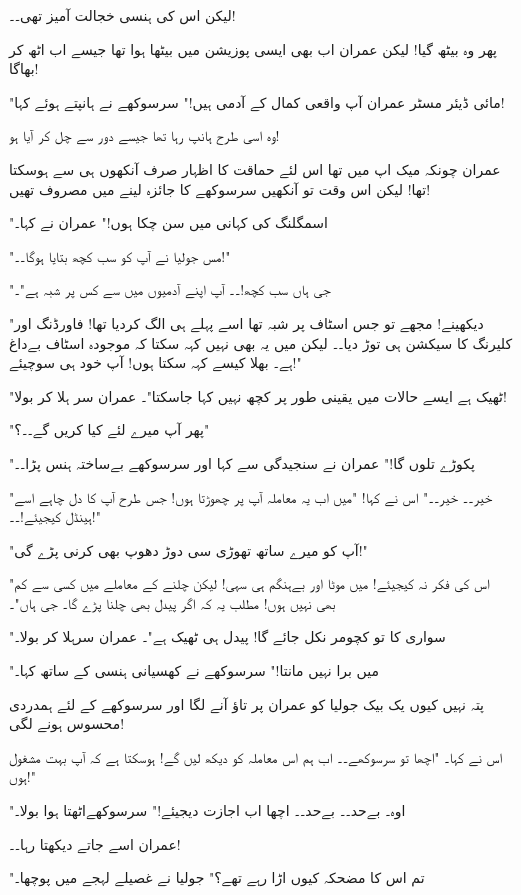 لیکن اس کی ہنسی خجالت آمیز تھی۔۔!

پھر وہ بیٹھ گیا! لیکن عمران اب بھی ایسی پوزیشن میں بیٹھا ہوا تھا جیسے اب اٹھ کر بھاگا!

"مائی ڈیئر مسٹر عمران آپ واقعی کمال کے آدمی ہیں!" سرسوکھے نے ہانپتے ہوئے کہا!

وہ اسی طرح ہانپ رہا تھا جیسے دور سے چل کر آیا ہو!

عمران چونکہ میک اپ میں تھا اس لئے حماقت کا اظہار صرف آنکھوں ہی سے ہوسکتا تھا! لیکن اس وقت تو آنکھیں سرسوکھے کا جائزہ لینے میں مصروف تھیں!

"اسمگلنگ کی کہانی میں سن چکا ہوں!" عمران نے کہا۔

"مس جولیا نے آپ کو سب کچھ بتایا ہوگا۔۔!"

"جی ہاں سب کچھ!۔۔ آپ اپنے آدمیوں میں سے کس پر شبہ ہے"۔

"دیکھینے! مجھے تو جس اسٹاف پر شبہ تھا اسے پہلے ہی الگ کردیا تھا! فاورڈنگ اور کلیرنگ کا سیکشن ہی توڑ دیا۔۔ لیکن میں یہ بھی نہیں کہہ سکتا کہ موجودہ اسٹاف بےداغ ہے۔ بھلا کیسے کہہ سکتا ہوں! آپ خود ہی سوچیئے!"

"ٹھیک ہے ایسے حالات میں یقینی طور پر کچھ نہیں کہا جاسکتا"۔ عمران سر ہلا کر بولا!

"پھر آپ میرے لئے کیا کریں گے۔۔؟"

"پکوڑے تلوں گا!" عمران نے سنجیدگی سے کہا اور سرسوکھے بےساختہ ہنس پڑا۔۔

"خیر۔۔ خیر۔۔" اس نے کہا! "میں اب یہ معاملہ آپ پر چھوڑتا ہوں! جس طرح آپ کا دل چاہے اسے ہینڈل کیجیئے!۔۔!"

"آپ کو میرے ساتھ تھوڑی سی دوڑ دھوپ بھی کرنی پڑے گی!"

"اس کی فکر نہ کیجیئے! میں موٹا اور بےہنگم ہی سہی! لیکن چلنے کے معاملے میں کسی سے کم بھی نہیں ہوں! مطلب یہ کہ اگر پیدل بھی چلنا پڑے گا۔ جی ہاں"۔

"سواری کا تو کچومر نکل جائے گا! پیدل ہی ٹھیک ہے"۔ عمران سرہلا کر بولا۔

"میں برا نہیں مانتا!" سرسوکھے نے کھسیانی ہنسی کے ساتھ کہا۔

پتہ نہیں کیوں یک بیک جولیا کو عمران پر تاؤ آنے لگا اور سرسوکھے کے لئے ہمدردی محسوس ہونے لگی!

اس نے کہا۔ "اچھا تو سرسوکھے۔۔ اب ہم اس معاملہ کو دیکھ لیں گے! ہوسکتا ہے کہ آپ بہت مشغول ہوں!"

"اوہ۔ بےحد۔۔ بےحد۔۔ اچھا اب اجازت دیجیئے!" سرسوکھےاٹھتا ہوا بولا۔

عمران اسے جاتے دیکھتا رہا۔۔!

"تم اس کا مضحکہ کیوں اڑا رہے تھے؟" جولیا نے غصیلے لہجے میں پوچھا۔

